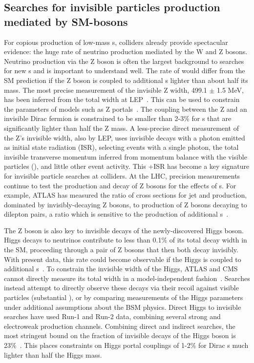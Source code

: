 \subsection{Searches for invisible particles production mediated by SM-bosons}
\label{sec:results_ZHSearches}

For copious production of low-mass {\IP}s, colliders already provide spectacular evidence: the huge rate of neutrino production mediated by the W and Z bosons. 
Neutrino production via the Z boson is often the largest background to searches for new {\IP}s and is important to understand well.
The rate of would differ from the SM prediction if the Z boson is coupled to additional {\IP}s lighter than about half its mass.
The most precise measurement of the invisible Z width, 499.1 $\pm$ 1.5 MeV, has been inferred from the total width at LEP~\cite{ALEPH:2005ab}.
This can be used to constrain the parameters of models such as Z portals~\cite{Carena:2003aj,Escudero:2016gzx}.
The coupling between the Z and an invisible Dirac fermion is constrained to be smaller than 2-3\% for {\IP}s that are significantly lighter than half the Z mass.
A less-precise direct measurement of the Z's invisible width, also by LEP, uses invisible decays with a photon emitted as initial state radiation (ISR), selecting events with a single photon, the total invisible transverse momentum inferred from momentum balance with the visible particles (\MET), and little other event activity.
This \MET+ISR has become a key signature for invisible particle searches at colliders. 
At the LHC, precision measurements continue to test the production and decay of Z bosons for the effects of {\IP}s. 
For example, ATLAS has measured the ratio of cross sections for jet and \MET production, dominated by invisibly-decaying Z bosons, to production of Z bosons decaying to dilepton pairs, a ratio which is sensitive to the production of additional {\IP}s~\cite{Aaboud:2017buf}. 

The Z boson is also key to invisible decays of the newly-discovered Higgs boson.
Higgs decays to neutrinos contribute to less than 0.1\% of its total decay width in the SM, proceeding through a pair of Z bosons that then both decay invisibly.
With present data, this rate could become observable if the Higgs is coupled to additional {\IP}s~\cite{Khachatryan:2016vau,Aad:2015pla}.
To constrain the invisible width of the Higgs, ATLAS and CMS cannot directly measure its total width in a model-independent fashion~\cite{Dobrescu:2012td}.
Searches instead attempt to directly observe these decays via their recoil against visible particles (substantial \MET), or by comparing measurements of the Higgs parameters under additional assumptions about the BSM physics.
Direct Higgs to invisible searches have used Run-1 and Run-2 data, combining several strong and electroweak production channels.
Combining direct and indirect searches, the most stringent bound on the fraction of invisible decays of the Higgs boson is 23\%~\cite{Khachatryan:2016whc,Aad:2015pla}.
This places constraints on Higgs portal couplings of 1-2\% for Dirac {\IP}s much lighter than half the Higgs mass. 

